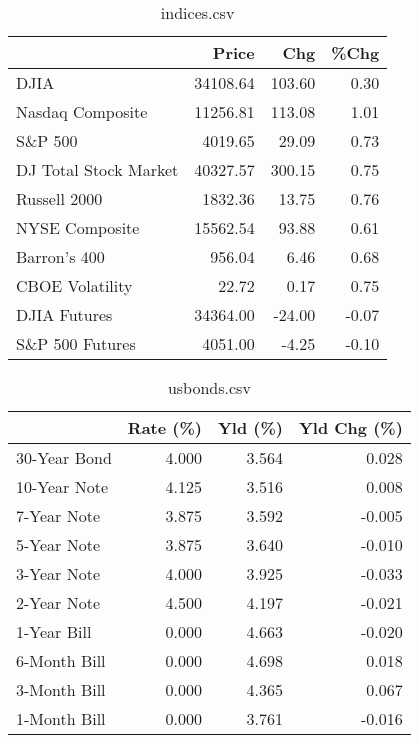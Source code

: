 \documentclass{article}%
\begin{document}
%


\begin{table}[htbp]%
\caption{indices.csv}%
\centering%
\begin{adjustbox}{width=1\textwidth}%
\begin{tabular}{lrrr}
\toprule
                      &    Price &    Chg &  \%Chg \\
\midrule
                 DJIA & 34108.64 & 103.60 &  0.30 \\
     Nasdaq Composite & 11256.81 & 113.08 &  1.01 \\
              S\&P 500 &  4019.65 &  29.09 &  0.73 \\
DJ Total Stock Market & 40327.57 & 300.15 &  0.75 \\
         Russell 2000 &  1832.36 &  13.75 &  0.76 \\
       NYSE Composite & 15562.54 &  93.88 &  0.61 \\
         Barron's 400 &   956.04 &   6.46 &  0.68 \\
      CBOE Volatility &    22.72 &   0.17 &  0.75 \\
         DJIA Futures & 34364.00 & -24.00 & -0.07 \\
      S\&P 500 Futures &  4051.00 &  -4.25 & -0.10 \\
\bottomrule
\end{tabular}
%
\end{adjustbox}%
\end{table}

%


\begin{table}[htbp]%
\caption{usbonds.csv}%
\centering%
\begin{adjustbox}{width=1\textwidth}%
\begin{tabular}{lrrr}
\toprule
             &  Rate (\%) &  Yld (\%) &  Yld Chg (\%) \\
\midrule
30-Year Bond &     4.000 &    3.564 &        0.028 \\
10-Year Note &     4.125 &    3.516 &        0.008 \\
 7-Year Note &     3.875 &    3.592 &       -0.005 \\
 5-Year Note &     3.875 &    3.640 &       -0.010 \\
 3-Year Note &     4.000 &    3.925 &       -0.033 \\
 2-Year Note &     4.500 &    4.197 &       -0.021 \\
 1-Year Bill &     0.000 &    4.663 &       -0.020 \\
6-Month Bill &     0.000 &    4.698 &        0.018 \\
3-Month Bill &     0.000 &    4.365 &        0.067 \\
1-Month Bill &     0.000 &    3.761 &       -0.016 \\
\bottomrule
\end{tabular}
%
\end{adjustbox}%
\end{table}
\end{document}
